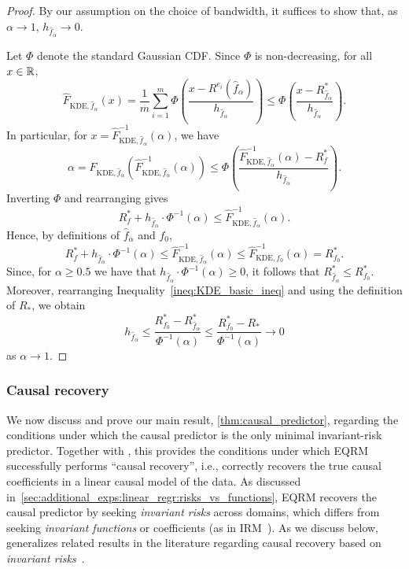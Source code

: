 \documentclass{article}
\begin{document}
\begin{proof}
    By our assumption on the choice of bandwidth, it suffices to show that, as $\alpha \to 1$, $h_{\hat f_{\alpha}} \to 0$.
    
    Let $\Phi$ denote the standard Gaussian CDF. Since $\Phi$ is non-decreasing, for all $x \in \mathbb{R}$,
    \[\hat F_{\text{KDE},\hat f_{\alpha}}(x)
      = \frac{1}{m} \sum_{i = 1}^m \Phi \left( \frac{x - R^{e_i}(\hat f_{\alpha})}{h_{\hat f_{\alpha}}} \right)
      \leq \Phi \left( \frac{x - R_{\hat f_{\alpha}}^*}{h_{\hat f_{\alpha}}} \right).\]
    In particular, for $x = \hat F^{-1}_{\text{KDE},\hat f_{\alpha}}(\alpha)$, we have
    \[\alpha = \hat F_{\text{KDE},\hat f_{\alpha}}(\hat F^{-1}_{\text{KDE},\hat f_{\alpha}}(\alpha))
      \leq \Phi \left( \frac{\hat F^{-1}_{\text{KDE},\hat f_{\alpha}}(\alpha) - R_f^*}{h_{\hat f_{\alpha}}} \right).\]
    Inverting $\Phi$ and rearranging gives
    \[R_f^* + h_{\hat f_{\alpha}} \cdot \Phi^{-1}(\alpha)
      \leq \hat F^{-1}_{\text{KDE},\hat f_{\alpha}}(\alpha).\]
    Hence, by definitions of $\hat f_{\alpha}$ and $f_0$,
    \begin{equation}
        R_f^* + h_{\hat f_{\alpha}} \cdot \Phi^{-1}(\alpha)
        \leq \hat F^{-1}_{\text{KDE},\hat f_{\alpha}}(\alpha)
        \leq \hat F^{-1}_{\text{KDE},f_0}(\alpha)
        = R_{f_0}^*.
        \label{ineq:KDE_basic_ineq}
    \end{equation}
    Since, for $\alpha \geq 0.5$ we have that $h_{\hat f_{\alpha}} \cdot \Phi^{-1}(\alpha) \geq 0$, it follows that $R_{\hat f_\alpha}^* \leq R_{f_0}^*$. Moreover, rearranging Inequality~\eqref{ineq:KDE_basic_ineq} and using the definition of $R_*$, we obtain
    \[h_{\hat f_{\alpha}}
     \leq \frac{R_{f_0}^* - R^*_{\hat f_{\alpha}}}{\Phi^{-1}(\alpha)}
     \leq \frac{R_{f_0}^* - R_*}{\Phi^{-1}(\alpha)}
     \to 0\]
     as $\alpha \to 1$.
\end{proof}

\subsubsection{Causal recovery}
\label{app:causal_recovery}
We now discuss and prove our main result, \cref{thm:causal_predictor}, regarding the conditions under which the causal predictor is the only minimal invariant-risk predictor. Together with , this provides the conditions under which EQRM successfully performs ``causal recovery'', i.e., correctly recovers the true causal coefficients in a linear causal model of the data. As discussed in~\cref{sec:additional_exps:linear_regr:risks_vs_functions}, EQRM recovers the causal predictor by seeking \textit{invariant risks} across domains, which differs from seeking \textit{invariant functions} or coefficients (as in IRM~\citep{arjovsky2020invariant}). As we discuss below,  generalizes related results in the literature regarding causal recovery based on \textit{invariant risks}~\citep{krueger21rex,peters2016causal}.
\end{document}
